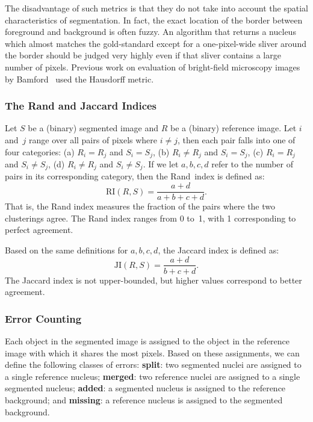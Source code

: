 \documentclass{article}
\begin{document}
The disadvantage of such metrics is that they do not take into account the spatial characteristics of segmentation. In fact, the exact location of the border between foreground and background is often fuzzy. An algorithm that returns a nucleus which almost matches the gold-standard except for a one-pixel-wide sliver around the border should be judged very highly even if that sliver contains a large number of pixels. Previous work on evaluation of bright-field microscopy images by Bamford~\cite{Bamford2003Empirical} used the Hausdorff metric.

\subsubsection{The Rand and Jaccard Indices}

Let $S$ be a (binary) segmented image and $R$ be a (binary) reference image. Let $i$ and~$j$ range over all pairs of pixels where $i \ne j$, then each pair falls into one of four categories: (a) $R_i = R_j$ and $S_i = S_j$, (b) $R_i \ne R_j$ and $S_i = S_j$, (c) $R_i = R_j$ and $S_i \ne S_j$, (d) $R_i \ne R_j$ and $S_i \ne S_j$. If we let $a,b,c,d$ refer to the number of pairs in its corresponding category, then the Rand~index is defined as:
\begin{equation}
\text{RI}(R,S) = \frac{a+d}{a+b+c+d}.
\label{eq:rand}
\end{equation}%
%
That is, the Rand index measures the fraction of the pairs where the two clusterings agree. The Rand index ranges from 0 to~1, with 1 corresponding to perfect agreement.

Based on the same definitions for $a,b,c,d$, the Jaccard index is defined as:
%
\begin{equation}
\text{JI}(R,S) = \frac{a+d}{b+c+d}.
\label{eq:jaccard}
\end{equation}%
The Jaccard index is not upper-bounded, but higher values correspond to better agreement.

\subsubsection{Error Counting}
Each object in the segmented image is assigned to the object in the reference image with which it shares the most pixels. Based on these assignments, we can define the following classes of errors: \textbf{split}: two segmented nuclei are assigned to a single reference nucleus; \textbf{merged}: two reference nuclei are assigned to a single segmented nucleus; \textbf{added}: a segmented nucleus is assigned to the reference background; and \textbf{missing}: a reference nucleus is assigned to the segmented background.
\end{document}
